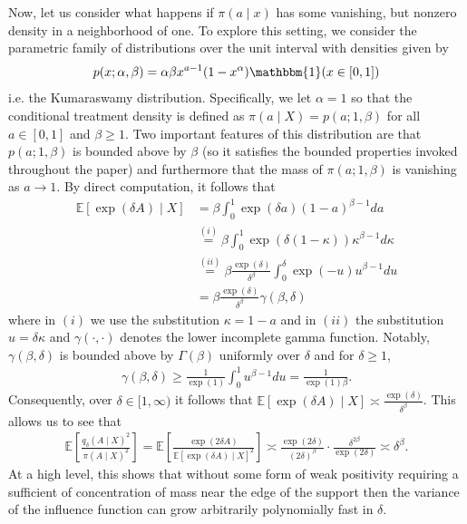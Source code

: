 \documentclass[11pt,twoside]{article}
\theoremstyle{definition}
\theoremstyle{remark}
\begin{document}
Now, let us consider what happens if $\pi(a \mid x)$ has some vanishing, but nonzero density in a neighborhood of one. To explore this setting, we consider the parametric family of distributions over the unit interval with densities given by
\begin{align*}
    p(x; \alpha, \beta) = \alpha \beta x^{a-1}(1-x^\alpha) \mathbbm{1}(x \in [0, 1])
\end{align*}
i.e. the Kumaraswamy distribution. Specifically, we let $\alpha = 1$ so that the conditional treatment density is defined as $\pi(a \mid X) = p(a; 1, \beta)$ for all $a \in [0, 1]$ and $\beta \geq 1$. Two important features of this distribution are that $p(a; 1, \beta)$ is bounded above by $\beta$ (so it satisfies the bounded properties invoked throughout the paper) and furthermore that the mass of $\pi(a; 1, \beta)$ is vanishing as $a \to 1$. By direct computation, it follows that
\begin{align*}
    \mathbb{E}\left[\exp(\delta A) \mid X \right] &= \beta \int^1_0 \exp(\delta a) (1 - a)^{\beta - 1} da \\
    &\overset{(i)}{=} \beta \int^1_0 \exp(\delta(1 - \kappa)) \kappa^{\beta - 1} d \kappa  \\
    &\overset{(ii)}{=} \beta \frac{\exp(\delta)}{\delta^\beta} \int^\delta_0 \exp(-u) u^{\beta - 1} du \\
    &=  \beta \frac{\exp(\delta)}{\delta^\beta} \gamma(\beta, \delta)
\end{align*}
where in $(i)$ we use the substitution $\kappa = 1 - a$ and in $(ii)$ the substitution $u = \delta \kappa$ and $\gamma(\cdot, \cdot)$ denotes the lower incomplete gamma function. Notably, $\gamma(\beta, \delta)$ is bounded above by $\Gamma(\beta)$ uniformly over $\delta$ and for $\delta \geq 1$, 
\begin{align*}
    \gamma(\beta, \delta) \geq \frac{1}{\exp(1)} \int^1_0 u^{\beta - 1} du = \frac{1}{\exp(1) \beta}.
\end{align*}
Consequently, over $\delta \in [1, \infty)$ it follows that $\mathbb{E}\left[\exp(\delta A) \mid X \right] \asymp \frac{\exp(\delta)}{\delta^\beta}$. This allows us to see that
\begin{align*}
      \mathbb{E}\left[\frac{q_\delta(A \mid X)^2}{\pi(A \mid X)^2}\right] = \mathbb{E}\left[ \frac{\exp(2 \delta A)}{\mathbb{E}\left[ \exp(\delta A) \mid X \right]^2} \right] \asymp \frac{\exp(2 \delta)}{(2 \delta)^\beta} \cdot \frac{\delta^{2 \beta}}{\exp(2 \delta)} \asymp \delta^\beta.
\end{align*}
At a high level, this shows that without some form of weak positivity requiring a sufficient of concentration of mass near the edge of the support then the variance of the influence function can grow arbitrarily polynomially fast in $\delta$.
\end{document}
